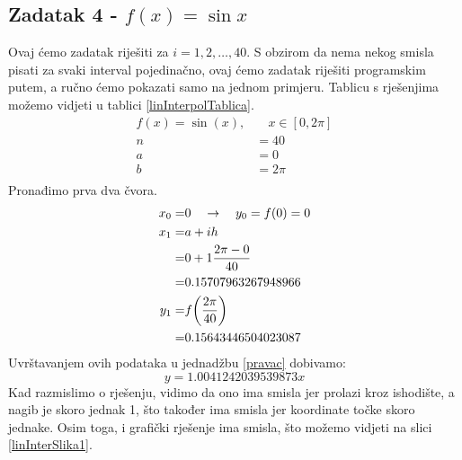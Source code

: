 \documentclass[12pt,a4paper]{report}
\begin{document}
		\subsection{Zadatak 4 - $f(x)=\sin x$}
			Ovaj ćemo zadatak riješiti za $i=1, 2,\ldots, 40$. S obzirom da nema nekog smisla pisati za svaki interval pojedinačno, ovaj ćemo zadatak riješiti programskim putem, a ručno ćemo pokazati samo na jednom primjeru. Tablicu s rješenjima možemo vidjeti u tablici \ref{linInterpolTablica}.
			\begin{align*}
				f(x)=\sin (x),& \quad x\in [0, 2\pi]\\
				n&=40\\
				a&=0\\
				b&=2\pi\\
			\end{align*}
			Pronađimo prva dva čvora. %
%	
%	
			\begin{align*}
				x_0=&0\quad\rightarrow \quad y_0=f(0)=0\\
				x_1=&a+ih\\=&0+1\frac{2\pi-0}{40}\\
					=&0.15707963267948966\\
				y_1=&f\biggr{(}\frac{2\pi}{40}\biggr{)}\\=&0.15643446504023087
			\end{align*}
			Uvrštavanjem ovih podataka u jednadžbu \ref{pravac} dobivamo:
			\begin{equation}
				y=1.0041242039539873x
				\label{linInt1}
			\end{equation}
			Kad razmislimo o rješenju, vidimo da ono ima smisla jer prolazi kroz ishodište, a nagib je skoro jednak 1, što također ima smisla jer koordinate točke skoro jednake. Osim toga, i grafički rješenje ima smisla, što možemo vidjeti na slici \ref{linInterSlika1}.
\end{document}
